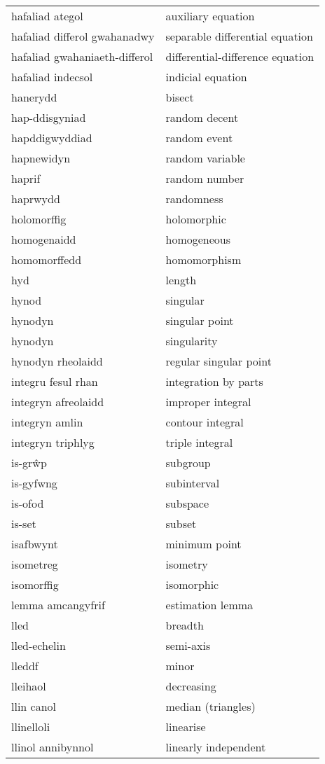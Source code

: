 \begin{supertabular}{p{0.22\textwidth}p{0.22\textwidth}}
hafaliad ategol & auxiliary equation \\
hafaliad differol gwahanadwy & separable differential equation \\
hafaliad gwahaniaeth-differol & differential-difference equation \\
hafaliad indecsol & indicial equation \\
hanerydd & bisect \\
hap-ddisgyniad & random decent \\
hapddigwyddiad & random event \\
hapnewidyn & random variable \\
haprif & random number \\
haprwydd & randomness \\
holomorffig & holomorphic \\
homogenaidd & homogeneous \\
homomorffedd & homomorphism \\
hyd & length \\
hynod & singular \\
hynodyn & singular point \\
hynodyn & singularity \\
hynodyn rheolaidd & regular singular point \\
integru fesul rhan & integration by parts \\
integryn afreolaidd & improper integral \\
integryn amlin & contour integral \\
integryn triphlyg & triple integral \\
is-grŵp & subgroup \\
is-gyfwng & subinterval \\
is-ofod & subspace \\
is-set & subset \\
isafbwynt & minimum point \\
isometreg & isometry \\
isomorffig & isomorphic \\
lemma amcangyfrif & estimation lemma \\
lled & breadth \\
lled-echelin & semi-axis \\
lleddf & minor \\
lleihaol & decreasing \\
llin canol & median (triangles) \\
llinelloli & linearise \\
llinol annibynnol & linearly independent \\

\end{supertabular}

